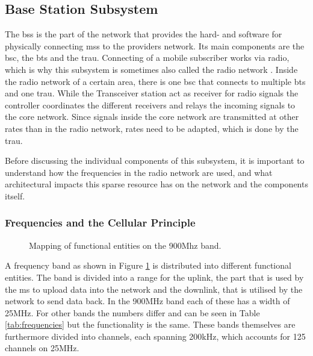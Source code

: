 \subsection{Base Station Subsystem}
\label{sec:bss}
The \gls{bss} is the part of the network that provides the hard- and software for physically connecting \glspl{ms} to the providers network.
Its main components are the \gls{bsc}, the \gls{bts} and the \gls{trau}.
Connecting of a mobile subscriber works via radio, which is why this subsystem is sometimes also called the radio network \cite{kommsys2006}.
Inside the radio network of a certain area, there is one \gls{bsc} that connects to multiple \gls{bts} and one \gls{trau}.
While the Transceiver station act as receiver for radio signals the controller coordinates the different receivers and relays the incoming signals  to the core network.
Since signals inside the core network are transmitted at other rates than in the radio network, rates need to be adapted, which is done by the \gls{trau}.

Before discussing the individual components of this subsystem, it is important to understand how the frequencies in the radio network are used, and what architectural impacts this sparse resource has on the network and the components itself.

\subsubsection{Frequencies and the Cellular Principle}
\begin{figure}
\caption{Mapping of functional entities on the 900Mhz band.}
\label{fig:frequency}
\end{figure}

A frequency band as shown in Figure \ref{fig:frequency} is distributed into different functional entities.
The band is divided into a range for the uplink, the part that is used by the \gls{ms} to upload data into the network and the downlink, that is utilised by the network to send data back.
In the 900MHz band each of these has a width of 25MHz.
For other bands the numbers differ and can be seen in Table \ref{tab:frequencies} but the functionality is the same.
These bands themselves are furthermore divided into channels, each spanning 200kHz, which accounts for 125 channels on 25MHz.

